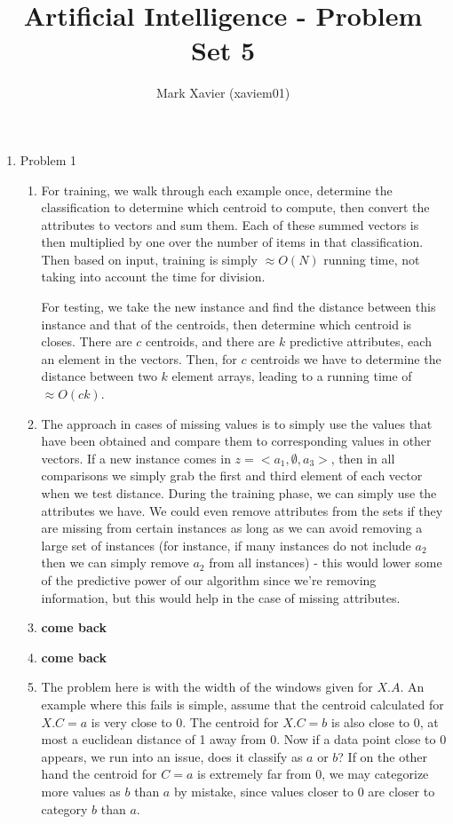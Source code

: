 \documentclass{article}
\title{Artificial Intelligence - Problem Set 5}
\author{Mark Xavier (xaviem01)}
\begin{document}
	\maketitle
	
	\begin{enumerate}
		\item Problem 1
		\begin{enumerate}
			\item For training, we walk through each example once, determine the classification to determine which centroid to compute, then convert the attributes to vectors and sum them.  Each of these summed vectors is then multiplied by one over the number of items in that classification.  Then based on input, training is simply $\approx O(N)$ running time, not taking into account the time for division.
			
			For testing, we take the new instance and find the distance between this instance and that of the centroids, then determine which centroid is closes.  There are $c$ centroids, and there are $k$ predictive attributes, each an element in the vectors.  Then, for $c$ centroids we have to determine the distance between two $k$ element arrays, leading to a running time of $\approx O(ck)$.
			
			\item The approach in cases of missing values is to simply use the values that have been obtained and compare them to corresponding values in other vectors.  If a new instance comes in $z = <a_1, \emptyset, a_3>$, then in all comparisons we simply grab the first and third element of each vector when we test distance.  During the training phase, we can simply use the attributes we have.  We could even remove attributes from the sets if they are missing from certain instances as long as we can avoid removing a large set of instances (for instance, if many instances do not include $a_2$ then we can simply remove $a_2$ from all instances) - this would lower some of the predictive power of our algorithm since we're removing information, but this would help in the case of missing attributes.
			
			\item \textbf{come back}
			
			\item \textbf{come back}
			
			\item The problem here is with the width of the windows given for $X.A$.  An example where this fails is simple, assume that the centroid calculated for $X.C = a$ is very close to $0$.  The centroid for $X.C = b$ is also close to $0$, at most a euclidean distance of 1 away from 0.  Now if a data point close to $0$ appears, we run into an issue, does it classify as $a$ or $b$?  If on the other hand the centroid for $C=a$ is extremely far from 0, we may categorize more values as $b$ than $a$ by mistake, since values closer to 0 are closer to category $b$ than $a$.
			

\end{enumerate}
\end{enumerate}
\end{document}
